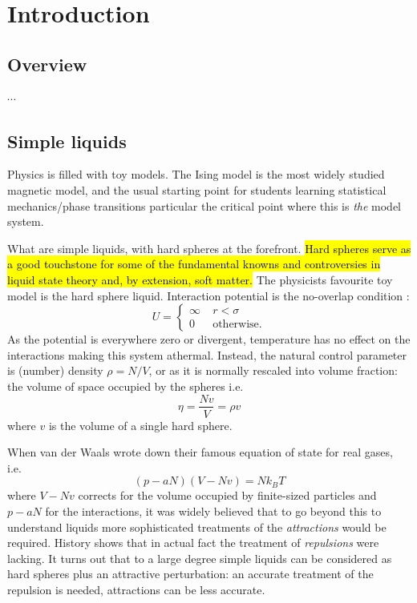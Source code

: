 \documentclass[11pt,twoside]{report}
\begin{document}
\chapter{Introduction}

\section{Overview}

$\cdots$


\section{Simple liquids}

Physics is filled with toy models.
The Ising model is the most widely studied magnetic model, and the usual starting point for students learning statistical mechanics/phase transitions particular the critical point where this is \emph{the} model system.

What are simple liquids, with hard spheres at the forefront.
\hl{Hard spheres serve as a good touchstone for some of the fundamental knowns and controversies in liquid state theory and, by extension, soft matter.}
The physicists favourite toy model is the hard sphere liquid.
Interaction potential is the no-overlap condition%
:
\begin{equation}
  U =
  \begin{cases}
    \infty & \; r < \sigma \\
    0 & \; \textrm{otherwise}.
  \end{cases}
\end{equation}
As the potential is everywhere zero or divergent, temperature has no effect on the interactions making this system athermal.
Instead, the natural control parameter is (number) density $\rho = N/V$, or as it is normally rescaled into volume fraction: the volume of space occupied by the spheres i.e.\
\begin{equation}
  \eta = \frac{N v}{V} = \rho v
\end{equation}
where $v$ is the volume of a single hard sphere.

When van der Waals wrote down their famous equation of state for real gases, i.e.\
\begin{equation}
  (p - a N)(V - Nv) = N k_B T
\end{equation}
where $V - Nv$ corrects for the volume occupied by finite-sized particles and $p - aN$ for the interactions,
it was widely believed that to go beyond this to understand liquids more sophisticated treatments of the \emph{attractions} would be required.
History shows that in actual fact the treatment of \emph{repulsions} were lacking.
It turns out that to a large degree simple liquids can be considered as hard spheres plus an attractive perturbation: an accurate treatment of the repulsion is needed, attractions can be less accurate.
\end{document}
